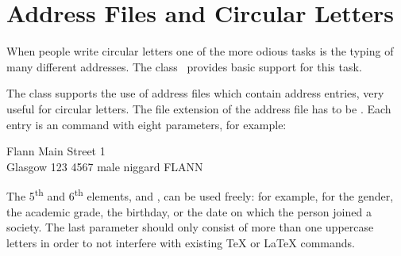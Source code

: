 %
%
%
%
%
%
%


\section{Address Files and Circular Letters}
\label{sec:scrlttr2.addressFile}%
%
%
%

When people write circular letters one of the more odious tasks is the typing
of many different addresses.  The class %
\iffalse%
, as did its predecessor \Class{scrlettr} as well,%
\fi%
\ provides basic support for this task.%
\iffalse%
\ Currently there are plans for much enhanced support.%
\fi

\begin{Declaration}
\end{Declaration}%
%
The class  supports the use of address files which
contain address entries, very useful for circular letters. The file
extension of the address file has to be . Each entry is an
 command with eight parameters, for example:
\begin{lstcode}
           {Flann}
           {Main Street 1\\ Glasgow}
           {123 4567}
           {male}
           {}
           {niggard}
           {FLANN}
\end{lstcode}
The 5\textsuperscript{th} and 6\textsuperscript{th} elements,  and
, can be used freely: for example, for the gender, the academic
grade, the birthday, or the date on which the person joined a society.  The
last parameter  should only consist of more than one uppercase
letters in order to not interfere with existing {\TeX} or {\LaTeX} commands.

